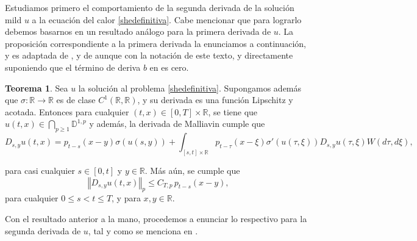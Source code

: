 \documentclass[letterpaper,twoside,12pt]{book}
\newcommand{\R}{\mathbb{R}}
\newcommand{\D}{\mathbb{D}}
\newcommand{\1}{\mathds{1}}
\renewcommand{\to}{\rightarrow}
\newcommand{\norm}[1]{\left\Vert #1 \right\Vert}
\theoremstyle{definition}
\theoremstyle{definition}
\newtheorem{teo}{Teorema}
\theoremstyle{remark}
\theoremstyle{definition}
\theoremstyle{definition}
\theoremstyle{definition}
\theoremstyle{definition}
\theoremstyle{definition}
\begin{document}
Estudiamos primero el comportamiento de la segunda derivada de la solución mild $u$ a la ecuación del calor \eqref{shedefinitiva}. Cabe mencionar que para lograrlo debemos basarnos en un resultado análogo para la primera derivada de $u$. La proposición correspondiente a la primera derivada la enunciamos a continuación, y es adaptada de \cite[proposición 5.1]{Nualart2007}, y de \cite[sección 4.1]{KUZGUN202268} aunque con la notación de este texto, y directamente suponiendo que el término de deriva $b$ en \cite{Nualart2007} es cero.

\begin{teo}\label{teocota1eraderivada}
   Sea $u$ la solución al problema \eqref{shedefinitiva}. Supongamos además que $\sigma:\R\to\R$ es de clase $C^1(\R,\R)$, y su derivada es una función Lipschitz y acotada. Entonces para cualquier $(t,x)\in [0,T]\times\R$, se tiene que $u(t,x)\in\bigcap_{p\geq1}\D^{1,p}$ y además, la derivada de Malliavin cumple que 
   \begin{equation}\label{formula1eraderivada}
      D_{s,y}u(t,x)=p_{t-s}(x-y)\sigma(u(s,y))+ \int_{[s,t]\times\R} p_{t-\tau}(x-\xi)\sigma'(u(\tau,\xi))D_{s,y}u(\tau,\xi)W(d\tau,d\xi),
   \end{equation}
   
   para casi cualquier $s\in [0,t]$ y $y\in \R$. Más aún, se cumple que 
   \begin{equation}\label{cota1eraderivada} 
      \norm{D_{s,y}u(t,x)}_{p}\leq C_{T,p \ }p_{t-s}(x-y),
   \end{equation}
   para cualquier $0\leq s<t\leq T$, y para $x,y\in \R$.
 \end{teo}
Con el resultado anterior a la mano, procedemos a enunciar lo respectivo para la segunda derivada de $u$, tal y como se menciona en \cite{KUZGUN202268}.
\end{document}
